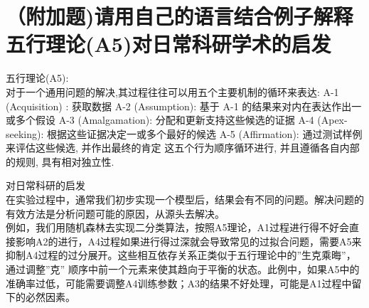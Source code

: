 \documentclass[11pt]{article}
\newenvironment{answer}{\par\color{MidnightBlue}}{\par}
\begin{document}
\section{（附加题)请用自己的语言结合例子解释五行理论(A5)对日常科研学术的启发}
\begin{answer}
五行理论(A5):\\
对于一个通用问题的解决,其过程往往可以用五个主要机制的循环来表达:
A-1 (Acquisition) : 获取数据
A-2 (Assumption): 基于 A-1 的结果来对内在表达作出一或多个假设
A-3 (Amalgamation): 分配和更新支持这些候选的证据
A-4 (Apex-seeking): 根据这些证据决定一或多个最好的候选
A-5 (Affirmation): 通过测试样例来评估这些候选, 并作出最终的肯定
这五个行为顺序循环进行, 并且遵循各自内部的规则, 具有相对独立性.

对日常科研的启发 \\
在实验过程中，通常我们初步实现一个模型后，结果会有不同的问题。解决问题的有效方法是分析问题可能的原因，从源头去解决。\\
例如，我们用随机森林去实现二分类算法，按照A5理论，A1过程进行得不好会直接影响A2的进行，A4过程如果进行得过深就会导致常见的过拟合问题，需要A5来抑制A4过程的过分展开。这些相互依存关系正类似于五行理论中的”生克乘晦”，通过调整”克” 顺序中前一个元素来使其趋向于平衡的状态。此例中，如果A5中的准确率过低，可能需要调整A4训练参数；A3的结果不好处理，可能是A1过程中留下的必然因素。
\end{answer}
\end{document}

